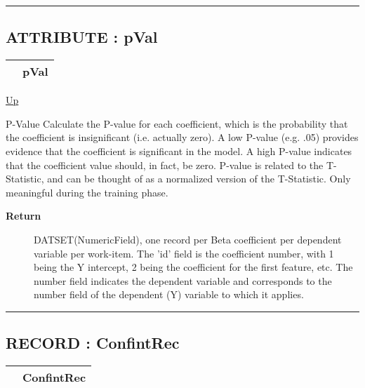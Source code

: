 \rule{\textwidth}{0.4pt}


\subsection*{ATTRIBUTE : pVal}
\hypertarget{ecldoc:linearregression.ols.pval}{}

{\renewcommand{\arraystretch}{1.5}
\begin{tabularx}{\textwidth}{|>{\raggedright\arraybackslash}l|X|}
\hline
\hspace{0pt} & pVal \\
\hline
\end{tabularx}
}

\hyperlink{ecldoc:linearregression.ols}{Up}

\par
P-Value Calculate the P-value for each coefficient, which is the probability that the coefficient is insignificant (i.e. actually zero). A low P-value (e.g. .05) provides evidence that the coefficient is significant in the model. A high P-value indicates that the coefficient value should, in fact, be zero. P-value is related to the T-Statistic, and can be thought of as a normalized version of the T-Statistic. Only meaningful during the training phase.

\par
\begin{description}
\item [\textbf{Return}] DATSET(NumericField), one record per Beta coefficient per dependent variable per work-item. The 'id' field is the coefficient number, with 1 being the Y intercept, 2 being the coefficient for the first feature, etc. The number field indicates the dependent variable and corresponds to the number field of the dependent (Y) variable to which it applies.
\end{description}

\rule{\textwidth}{0.4pt}
\subsection*{RECORD : ConfintRec}
\hypertarget{ecldoc:linearregression.ols.confintrec}{}

{\renewcommand{\arraystretch}{1.5}
\begin{tabularx}{\textwidth}{|>{\raggedright\arraybackslash}l|X|}
\hline
\hspace{0pt} & ConfintRec \\
\hline
\end{tabularx}
}


